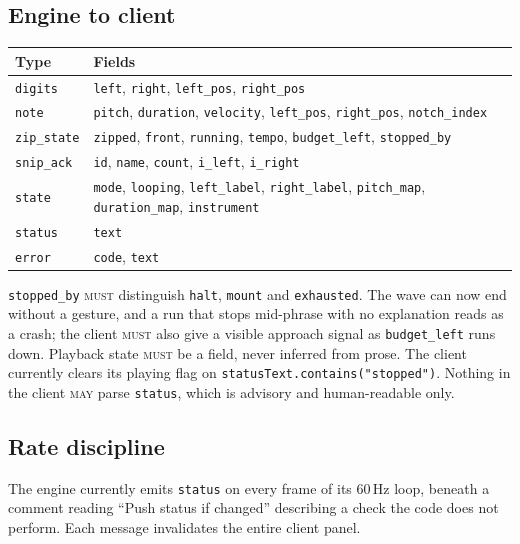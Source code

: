 \documentclass[11pt,a4paper]{article}
\newcommand{\MUST}{\textsc{must}}
\newcommand{\MAY}{\textsc{may}}
\theoremstyle{definition}
\theoremstyle{plain}
\theoremstyle{remark}
\begin{document}
\subsection{Engine to client}

\begin{center}
\begin{tabular}{l>{\raggedright\arraybackslash}p{9.2cm}}
\toprule
\textbf{Type} & \textbf{Fields} \\
\midrule
\texttt{digits}    & \texttt{left}, \texttt{right}, \texttt{left\_pos}, \texttt{right\_pos} \\
\texttt{note}      & \texttt{pitch}, \texttt{duration}, \texttt{velocity},
                     \texttt{left\_pos}, \texttt{right\_pos}, \texttt{notch\_index} \\
\texttt{zip\_state}& \texttt{zipped}, \texttt{front}, \texttt{running}, \texttt{tempo},
                     \texttt{budget\_left}, \texttt{stopped\_by} \\
\texttt{snip\_ack} & \texttt{id}, \texttt{name}, \texttt{count}, \texttt{i\_left}, \texttt{i\_right} \\
\texttt{state}     & \texttt{mode}, \texttt{looping}, \texttt{left\_label},
                     \texttt{right\_label}, \texttt{pitch\_map}, \texttt{duration\_map},
                     \texttt{instrument} \\
\texttt{status}    & \texttt{text} \\
\texttt{error}     & \texttt{code}, \texttt{text} \\
\bottomrule
\end{tabular}
\end{center}

\texttt{stopped\_by} \MUST{} distinguish \texttt{halt}, \texttt{mount} and
\texttt{exhausted}. The wave can now end without a gesture, and a run that stops mid-phrase with
no explanation reads as a crash; the client \MUST{} also give a visible approach signal as
\texttt{budget\_left} runs down. Playback state \MUST{} be a field, never inferred from prose. The client currently clears its
playing flag on \texttt{statusText.contains("stopped")}. Nothing in the client \MAY{} parse
\texttt{status}, which is advisory and human-readable only.

\subsection{Rate discipline}

The engine currently emits \texttt{status} on every frame of its 60\,Hz loop, beneath a comment
reading ``Push status if changed'' describing a check the code does not perform. Each message
invalidates the entire client panel.
\end{document}
